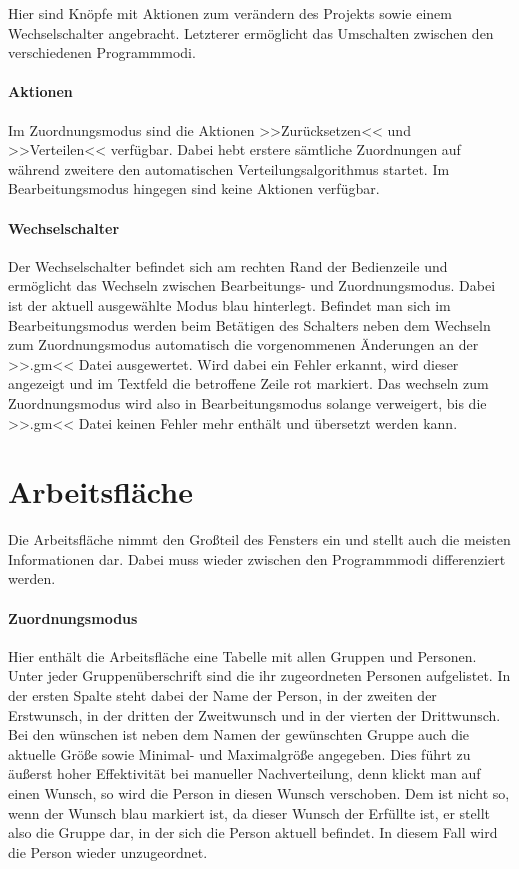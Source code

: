 Hier sind Knöpfe mit Aktionen zum verändern des Projekts sowie einem Wechselschalter angebracht. Letzterer ermöglicht das Umschalten zwischen den verschiedenen Programmmodi.
\paragraph{Aktionen} Im Zuordnungsmodus sind die Aktionen >>Zurücksetzen<< und >>Verteilen<< verfügbar. Dabei hebt erstere sämtliche Zuordnungen auf während zweitere den automatischen Verteilungsalgorithmus  startet. Im Bearbeitungsmodus hingegen sind keine Aktionen verfügbar.
\paragraph{Wechselschalter} Der Wechselschalter befindet sich am rechten Rand der Bedienzeile und ermöglicht das Wechseln zwischen Bearbeitungs- und Zuordnungsmodus. Dabei ist der aktuell ausgewählte Modus blau hinterlegt. Befindet man sich im Bearbeitungsmodus werden beim Betätigen des Schalters neben dem Wechseln zum Zuordnungsmodus automatisch die vorgenommenen Änderungen an der >>.gm<< Datei ausgewertet. Wird dabei ein Fehler erkannt, wird dieser angezeigt und im Textfeld  die betroffene Zeile rot markiert. Das wechseln zum Zuordnungsmodus wird also in Bearbeitungsmodus solange verweigert, bis die >>.gm<< Datei keinen Fehler mehr enthält und übersetzt werden kann.

\section{Arbeitsfläche}
\label{sec:arbeitsfläche}

Die Arbeitsfläche nimmt den Großteil des Fensters ein und stellt auch die meisten Informationen dar. Dabei muss wieder zwischen den Programmmodi differenziert werden.
\paragraph{Zuordnungsmodus} Hier enthält die Arbeitsfläche eine Tabelle mit allen Gruppen und Personen. Unter jeder Gruppenüberschrift sind die ihr zugeordneten Personen  aufgelistet. In der ersten Spalte steht dabei der Name der Person, in der zweiten der Erstwunsch, in der dritten der Zweitwunsch und in der vierten der Drittwunsch. Bei den wünschen ist neben dem Namen der gewünschten Gruppe auch die aktuelle Größe sowie Minimal- und Maximalgröße angegeben. Dies führt zu äußerst hoher Effektivität bei manueller Nachverteilung, denn klickt man auf einen Wunsch, so wird die Person in diesen Wunsch verschoben. Dem ist nicht so, wenn der Wunsch blau markiert ist, da dieser Wunsch der Erfüllte ist, er stellt also die Gruppe dar, in der sich die Person aktuell befindet. In diesem Fall wird die Person wieder unzugeordnet.
